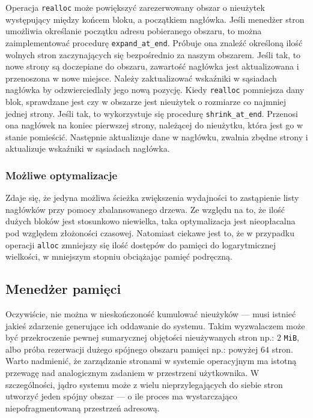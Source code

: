 \documentclass[12pt,a4paper,titlepage,twoside]{mwart}
\begin{document}
Operacja \verb+realloc+ może powiększyć zarezerwowany obszar o nieużytek
występujący między końcem bloku, a początkiem nagłówka. Jeśli menedżer stron
umożliwia określanie początku adresu pobieranego obszaru, to można
zaimplementować procedurę \verb+expand_at_end+. Próbuje ona znaleźć określoną
ilość wolnych stron zaczynających się bezpośrednio za naszym obszarem. Jeśli
tak, to nowe strony są doczepiane do obszaru, zawartość nagłówka jest
aktualizowana i przenoszona w nowe miejsce. Należy zaktualizować wskaźniki w
sąsiadach nagłówka by odzwierciedlały jego nową pozycję. Kiedy \verb+realloc+
pomniejsza dany blok, sprawdzane jest czy w obszarze jest nieużytek o rozmiarze
co najmniej jednej strony. Jeśli tak, to wykorzystuje się procedurę
\verb+shrink_at_end+. Przenosi ona nagłówek na koniec pierwszej strony,
należącej do nieużytku, która jest go w stanie pomieścić. Następnie aktualizuje
dane w nagłówku, zwalnia zbędne strony i aktualizuje wskaźniki w sąsiadach
nagłówka.

\subsubsection{Możliwe optymalizacje}

Zdaje się, że jedyna możliwa ścieżka zwiększenia wydajności to zastąpienie
listy nagłówków przy pomocy zbalansowanego drzewa. Ze względu na to, że ilość
dużych bloków jest stosunkowo niewielka, taka optymalizacja jest nieopłacalna
pod względem złożoności czasowej. Natomiast ciekawe jest to, że w przypadku
operacji \verb+alloc+ zmniejszy się ilość dostępów do pamięci do logarytmicznej
wielkości, w mniejszym stopniu obciążając pamięć podręczną.

\newpage

\subsection{Menedżer pamięci}

Oczywiście, nie można w nieskończoność kumulować nieużyków --- musi istnieć
jakieś zdarzenie generujące ich oddawanie do systemu. Takim wyzwalaczem może
być przekroczenie pewnej sumarycznej objętości nieużywanych stron np.: $2$
\verb+MiB+, albo próba rezerwacji dużego spójnego obszaru pamięci np.: powyżej
$64$ stron. Warto nadmienić, że zarządzanie stronami w systemie operacyjnym ma
istotną przewagę nad analogicznym zadaniem w przestrzeni użytkownika. W
szczególności, jądro systemu może z wielu nieprzylegających do siebie stron
utworzyć jeden spójny obszar --- o ile proces ma wystarczająco
niepofragmentowaną przestrzeń adresową.
\end{document}
